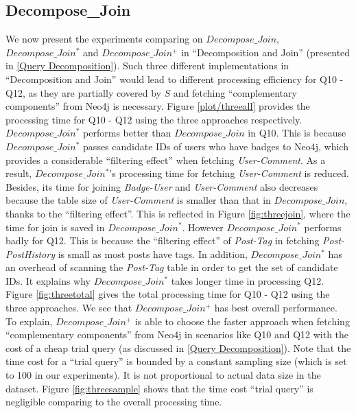 \subsection{Decompose\_Join}
\label{exp:DecomposeJoin}
We now present the experiments comparing on $Decompose\_Join$, $Decompose\_Join^{*}$ and $Decompose\_Join^{+}$ in ``Decomposition and Join'' (presented in \ref{Query Decomposition}). Such three different implementations in ``Decomposition and Join'' would lead to different processing efficiency for Q10 - Q12, as they are partially covered by $S$ and fetching ``complementary components'' from Neo4j is necessary. Figure \ref{plot/threeall} provides the processing time for Q10 - Q12 using the three approaches respectively. $Decompose\_Join^{*}$ performs  better than $Decompose\_Join$ in Q10. This is because $Decompose\_Join^{*}$ passes candidate IDs of users who have badges to Neo4j, which provides a considerable ``filtering effect'' when fetching \textit{User-Comment}. As a result, $Decompose\_Join^{*}$'s processing time for fetching \textit{User-Comment} is reduced. Besides, its time for joining \textit{Badge-User} and \textit{User-Comment} also decreases because the table size of \textit{User-Comment} is smaller than that in $Decompose\_Join$, thanks to the ``filtering effect''. This is reflected in Figure \ref{fig:threejoin}, where the time for join is saved in $Decompose\_Join^{*}$. However $Decompose\_Join^{*}$ performs badly for Q12. This is because the ``filtering effect'' of \textit{Post-Tag} in fetching \textit{Post-PostHistory} is small as most posts have tags. In addition, $Decompose\_Join^{*}$ has an overhead of scanning the \textit{Post-Tag} table in order to get the set of candidate IDs. It explains why $Decompose\_Join^{*}$ takes longer time in processing Q12. Figure \ref{fig:threetotal} gives the total processing time for Q10 - Q12 using the three approaches. We see that $Decompose\_Join^{+}$ has best overall performance. To explain,  $Decompose\_Join^{+}$ is able to choose the faster approach when fetching ``complementary components'' from Neo4j in scenarios like Q10 and Q12 with  the cost of a cheap trial query (as discussed in \ref{Query Decomposition}). Note that the time cost for a ``trial query'' is bounded by a constant sampling size (which is set to 100 in our experiments). It is not proportional to actual data size in the dataset. Figure \ref{fig:threesample} shows that the time cost ``trial query'' is negligible comparing to the overall processing time.


